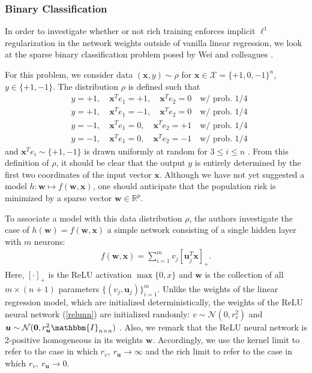 \documentclass{article}
\begin{document}
\subsubsection{Binary Classification}

In order to investigate whether or not rich training enforces implicit $\ell^1$ regularization in the network weights outside of vanilla linear regression, we look at the sparse binary classification problem posed by Wei and colleagues \cite{wei2019regularization}. 

For this problem, we consider data $(\boldsymbol{x}, y) \sim \rho$ for $\boldsymbol{x} \in \mathcal{X} = \{ +1, 0, -1 \}^n$, $y \in \{+1, -1\}$. The distribution $\rho$ is defined such that 
\begin{align*}
    &y = +1, \quad \boldsymbol{x}^Te_1 = +1, \quad \boldsymbol{x}^Te_2 = 0 \quad \text{w/ prob. 1/4}\\
    &y = +1, \quad \boldsymbol{x}^Te_1 = -1, \quad \boldsymbol{x}^Te_2 = 0 \quad \text{w/ prob. 1/4}\\
    &y = -1, \quad \boldsymbol{x}^Te_1 = 0, \quad \boldsymbol{x}^Te_2 = +1 \quad \text{w/ prob. 1/4}\\
    &y = -1, \quad \boldsymbol{x}^Te_1 = 0, \quad \boldsymbol{x}^Te_2 = -1 \quad \text{w/ prob. 1/4}
\end{align*}
and $\boldsymbol{x}^Te_i \sim \{+1, -1 \}$ is drawn uniformly at random for $3 \leq i \leq n$ \cite{wei2019regularization}. From this definition of $\rho$, it should be clear that the output $y$ is entirely determined by the first two coordinates of the input vector $\boldsymbol{x}$. Although we have not yet suggested a model $h: \boldsymbol{w} \mapsto f(\boldsymbol{w}, \boldsymbol{x})$, one should anticipate that the population risk is minimized by a sparse vector $\boldsymbol{w} \in \mathbb{R}^p$.

To associate a model with this data distribution $\rho$, the authors investigate the case of $h(\boldsymbol{w}) = f(\boldsymbol{w}, \boldsymbol{x})$ a simple network consisting of a single hidden layer with $m$ neurons:
\begin{align}\label{relunn}
    f(\boldsymbol{w}, \boldsymbol{x}) = \sum_{i=1}^m v_j[\boldsymbol{u}_j^T\boldsymbol{x}]_+.
\end{align}
Here, $[\cdot]_+$ is the ReLU activation $\max\{0, x \}$ and $\boldsymbol{w}$ is the collection of all $m \times (n+1)$ parameters $\{ (v_j, \boldsymbol{u}_j) \}_{i=1}^m$. Unlike the weights of the linear regression model, which are initialized deterministically, the weights of the ReLU neural network (\ref{relunn}) are initialized randomly: $v \sim \mathcal{N}(0, r_v^2)$ and $\boldsymbol{u} \sim \mathcal{N}(\boldsymbol{0}, r_{\boldsymbol{u}}^2\mathbbm{I}_{n \times n})$ \cite{wei2019regularization}. Also, we remark that the ReLU neural network is 2-positive homogeneous in its weights $\boldsymbol{w}$. Accordingly, we use the kernel limit to refer to the case in which $r_v, \ r_{\boldsymbol{u}} \rightarrow \infty$ and the rich limit to refer to the case in which $r_v, \ r_{\boldsymbol{u}} \rightarrow 0$. 
\end{document}
